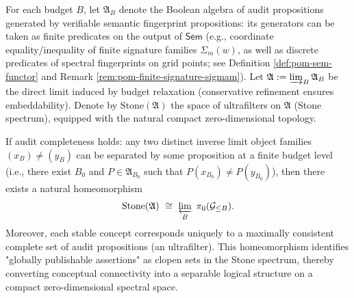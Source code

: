\begin{conclusion}\label{con:xi-audit-boolean-stone-spectrum}
For each budget \(B\), let \(\mathfrak{A}_B\) denote the Boolean algebra of audit propositions generated by verifiable semantic fingerprint propositions:
its generators can be taken as finite predicates on the output of \(\mathsf{Sem}\) (e.g., coordinate equality/inequality of finite signature families \(\Sigma_m(w)\), as well as discrete predicates of spectral fingerprints on grid points; see Definition \ref{def:pom-sem-functor} and Remark \ref{rem:pom-finite-signature-sigmam}).
Let \(\mathfrak{A}:=\varinjlim_B \mathfrak{A}_B\) be the direct limit induced by budget relaxation (conservative refinement ensures embeddability).
Denote by \(\mathrm{Stone}(\mathfrak{A})\) the space of ultrafilters on \(\mathfrak{A}\) (Stone spectrum), equipped with the natural compact zero-dimensional topology.

If audit completeness holds: any two distinct inverse limit object families \((x_B)\neq (y_B)\) can be separated by some proposition at a finite budget level (i.e., there exist \(B_0\) and \(P\in\mathfrak{A}_{B_0}\) such that \(P(x_{B_0})\neq P(y_{B_0})\)),
then there exists a natural homeomorphism
\[
\mathrm{Stone}(\mathfrak{A})\ \cong\ \varprojlim_{B}\ \pi_0(\mathcal{G}_{\le B}).
\]
Moreover, each stable concept corresponds uniquely to a maximally consistent complete set of audit propositions (an ultrafilter).
This homeomorphism identifies "globally publishable assertions" as clopen sets in the Stone spectrum, thereby converting conceptual connectivity into a separable logical structure on a compact zero-dimensional spectral space.
\end{conclusion}

